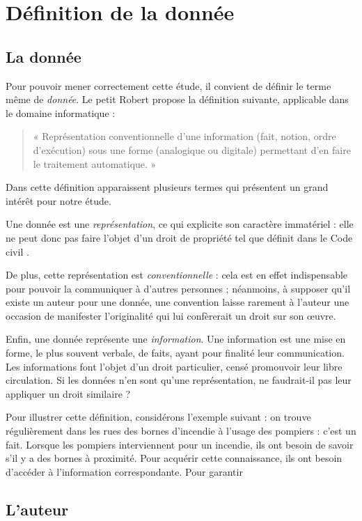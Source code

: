 \section{Définition de la donnée}

\subsection{La donnée}

Pour pouvoir mener correctement cette étude, il convient de définir le
terme même de \emph{donnée}. Le petit Robert \cite{robert2007} propose
la définition suivante, applicable dans le domaine informatique :

\begin{quotation}
  « Représentation conventionnelle d'une information (fait, notion,
  ordre d'exécution) sous une forme (analogique ou digitale)
  permettant d'en faire le traitement automatique. »
\end{quotation}

Dans cette définition apparaissent plusieurs termes qui présentent un
grand intérêt pour notre étude.

Une donnée est une \emph{représentation}, ce qui explicite son
caractère immatériel : elle ne peut donc pas faire l'objet d'un droit
de propriété tel que définit dans le Code civil \cite{ccivil}.

De plus, cette représentation est \emph{conventionnelle} : cela est en
effet indispensable pour pouvoir la communiquer à d'autres personnes ;
néanmoins, à supposer qu'il existe un auteur pour une donnée, une
convention laisse rarement à l'auteur une occasion de manifester
l'originalité qui lui confèrerait un droit sur son œuvre. %

Enfin, une donnée représente une \emph{information}. Une information
est une mise en forme, le plus souvent verbale, de faits, ayant pour
finalité leur communication. Les informations font l'objet d'un droit
particulier, censé promouvoir leur libre circulation. Si les données
n'en sont qu'une représentation, ne faudrait-il pas leur appliquer un
droit similaire ?

Pour illustrer cette définition, considérons l'exemple suivant : on
trouve régulièrement dans les rues des bornes d'incendie à l'usage des
pompiers : c'est un fait. Lorsque les pompiers interviennent pour un
incendie, ils ont besoin de savoir s'il y a des bornes à
proximité. Pour acquérir cette connaissance, ils ont besoin d'accéder
à l'information correspondante. Pour garantir

\subsection{L'auteur}






